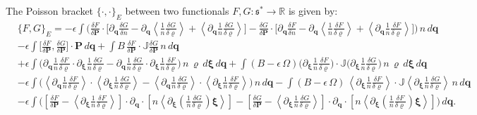 \documentclass[10pt]{article}
\begin{document}
The Poisson bracket $\{\cdot,\cdot\}_E$ between two functionals $F,G:\mathfrak{s}^*\rightarrow\mathbb{R}$ is given by:
\begin{align*}
&\{F,G\}_{E} = -\epsilon\int\bigg(\frac{\delta F}{\delta\bm{P}}\cdot \bigg[\partial_{\bm{q}}\frac{\delta G}{\delta n} - \partial_{\bm{q}}\left\langle\frac{1}{n}\frac{\delta G}{\delta\varrho}\right\rangle + \left\langle\partial_{\bm{q}}\frac{1}{n}\frac{\delta G}{\delta\varrho}\right\rangle\bigg]-\frac{\delta G}{\delta\bm{P}}\cdot \bigg[\partial_{\bm{q}}\frac{\delta F}{\delta n} - \partial_{\bm{q}}\left\langle\frac{1}{n}\frac{\delta F}{\delta\varrho}\right\rangle + \left\langle\partial_{\bm{q}}\frac{1}{n}\frac{\delta F}{\delta\varrho}\right\rangle\bigg]\bigg)\,n\,d\bm{q}\nonumber\\
%
&-\epsilon\int\bigg[\frac{\delta F}{\delta\bm{P}},\frac{\delta G}{\delta\bm{P}}\bigg]\cdot\bm{P}\,d\bm{q} +\int B\,\frac{\delta F}{\delta\bm{P}}\cdot \mathbb{J}\frac{\delta G}{\delta\bm{P}} \,n\,d\bm{q}\nonumber\\
&+\epsilon\int \bigg(\partial_{\bm{q}}\frac{1}{n}\frac{\delta F}{\delta \varrho}\cdot \partial_{\bm{\xi}}\frac{1}{n}\frac{\delta G}{\delta\varrho} -\partial_{\bm{q}}\frac{1}{n}\frac{\delta G}{\delta \varrho}\cdot \partial_{\bm{\xi}}\frac{1}{n}\frac{\delta F}{\delta\varrho} \bigg)\,n\,\varrho\,d\bm{\xi}\,d\bm{q} + \int (B-\epsilon\,\Omega)\bigg(\partial_{\bm{\xi}}\frac{1}{n}\frac{\delta F}{\delta\varrho}\bigg)\cdot\mathbb{J}\bigg(\partial_{\bm{\xi}}\frac{1}{n}\frac{\delta G}{\delta\varrho}\bigg)\,n\,\varrho\,d\bm{\xi}\,d\bm{q}\nonumber\\
&-\epsilon\int \bigg(\left\langle\partial_{\bm{q}}\frac{1}{n}\frac{\delta F}{\delta\varrho}\right\rangle\cdot\left\langle\partial_{\bm{\xi}}\frac{1}{n}\frac{\delta G}{\delta\varrho}\right\rangle-\left\langle\partial_{\bm{q}}\frac{1}{n}\frac{\delta G}{\delta\varrho}\right\rangle\cdot\left\langle\partial_{\bm{\xi}}\frac{1}{n}\frac{\delta F}{\delta\varrho}\right\rangle\bigg)\,n\,d\bm{q}-\int (B-\epsilon\,\Omega)\, \left\langle\partial_{\bm{\xi}}\frac{1}{n}\frac{\delta F}{\delta\varrho}\right\rangle\cdot \mathbb{J} \left\langle\partial_{\bm{\xi}}\frac{1}{n}\frac{\delta G}{\delta\varrho}\right\rangle\,n\,d\bm{q}\nonumber\\
&- \epsilon \int \bigg(\left[\frac{\delta F}{\delta\bm{P}} - \left\langle\partial_{\bm{\xi}}\frac{1}{n}\frac{\delta F}{\delta\varrho}\right\rangle\right]\cdot\partial_{\bm{q}}\cdot\left[n\left\langle\partial_{\bm{\xi}}\left(\frac{1}{n}\frac{\delta G}{\delta\varrho}\right)\bm{\xi}\right\rangle\right] -\left[\frac{\delta G}{\delta\bm{P}} - \left\langle\partial_{\bm{\xi}}\frac{1}{n}\frac{\delta G}{\delta\varrho}\right\rangle\right]\cdot\partial_{\bm{q}}\cdot\left[n\left\langle\partial_{\bm{\xi}}\left(\frac{1}{n}\frac{\delta F}{\delta\varrho}\right)\bm{\xi}\right\rangle\right] \bigg)\,d\bm{q}.
\end{align*}
\end{document}
